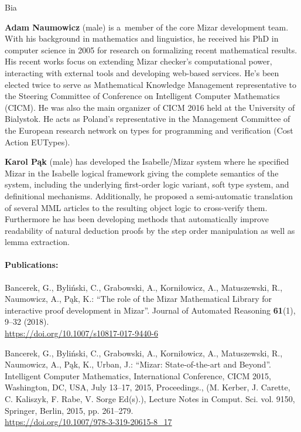 \begin{sitedescription}{Bia}
\begin{compactitem}
\item\textbf{Adam Naumowicz} (male) is a~member of the core Mizar development team. 
With his background in mathematics and linguistics, he received his PhD in computer science in 2005
for research on formalizing recent mathematical results. His recent works focus on extending Mizar checker's computational power, 
interacting with external tools and developing web-based services. 
He's been elected twice to serve as Mathematical Knowledge Management representative to the Steering Committee
of Conference on Intelligent Computer Mathematics (CICM).
He was also the main organizer of CICM 2016 held at the University of Bialystok. 
He acts as Poland's representative in the Management Committee of the European research network on types
 for programming and verification (Cost Action EUTypes).

\item\textbf{Karol Pąk} (male) has developed the Isabelle/Mizar system where
he specified Mizar in the Isabelle logical framework
giving the complete semantics of the system, including
the underlying first-order logic variant, soft type system, and definitional mechanisms.
Additionally, he proposed a semi-automatic translation of several MML articles
to the resulting object logic to cross-verify them.
Furthermore he has been developing methods
that automatically improve readability of natural deduction proofs
by the step order manipulation as well as lemma extraction.

\end{compactitem}

\paragraph{Publications:}

\begin{compactitem}

\item Bancerek, G., Byliński, C., Grabowski, A., Korniłowicz, A., Matuszewski, R., Naumowicz, A., Pąk, K.:
``The role of the {M}izar {M}athematical {L}ibrary for interactive proof development in {M}izar''.
Journal of Automated Reasoning \textbf{61}(1), 9--32 (2018).
\\\url{https://doi.org/10.1007/s10817-017-9440-6}

\item Bancerek, G., Byliński, C., Grabowski, A., Korniłowicz, A., Matuszewski, R., Naumowicz, A., Pąk, K., Urban, J.:
``Mizar: State-of-the-art and Beyond''.
Intelligent Computer Mathematics, International Conference, CICM 2015, Washington, DC, USA, 
July 13--17, 2015, Proceedings., (M. Kerber, J. Carette, C. Kaliszyk, F. Rabe, V. Sorge Ed(s).), 
Lecture Notes in Comput. Sci. vol. 9150, Springer, Berlin, 2015, pp. 261--279.
\\\url{https://doi.org/10.1007/978-3-319-20615-8_17}


\end{compactitem}
\end{sitedescription}
